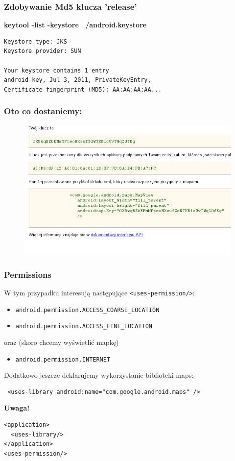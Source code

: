 \documentclass{beamer}
\begin{document}
\begin{frame}[fragile]\frametitle{Zdobywanie Md5 klucza 'release'}

\textbf{keytool -list -keystore ~/android.keystore }

\begin{lstlisting}
Keystore type: JKS
Keystore provider: SUN

Your keystore contains 1 entry
android-key, Jul 3, 2011, PrivateKeyEntry, 
Certificate fingerprint (MD5): AA:AA:AA:AA...
\end{lstlisting}

\end{frame}


\begin{frame}\frametitle{Oto co dostaniemy:}
\begin{figure}
 \centering
 \includegraphics[width=\textwidth,keepaspectratio=true]{images/maps_get_key}
\end{figure} 
\end{frame}


\begin{frame}[fragile]\frametitle{Permissions}

W tym przypadku interesują następujące \verb|<uses-permission/>|:

\begin{itemize}
 \item \verb|android.permission.ACCESS_COARSE_LOCATION|
 \item \verb|android.permission.ACCESS_FINE_LOCATION|
\end{itemize}

oraz (skoro chcemy wyświetlić mapkę)
\begin{itemize}
 \item \verb|android.permission.INTERNET|
\end{itemize}

\pause
Dodatkowo jeszcze deklarujemy wykorzystanie biblioteki maps:
\begin{verbatim}
 <uses-library android:name="com.google.android.maps" />
\end{verbatim}

\textbf{Uwaga!}
\begin{lstlisting}
<application>
  <uses-library/> 
</application>
<uses-permission/>
\end{lstlisting}
\end{frame}
\end{document}

